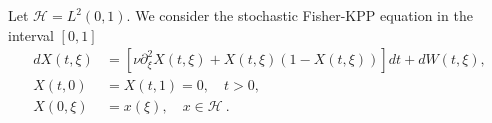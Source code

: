 Let $\mathcal{H} = L^2 (0,1)$. We consider the stochastic Fisher-KPP 
    equation in the interval $[0, 1]$
    \begin{equation}
        \label{eqn:fisher-kpp}
        \begin{aligned}
            d X(t, \xi) &= 
                \left[
                    \nu 
                    \partial_{\xi} ^ 2 X(t, \xi)
                    +
                    X(t, \xi) (1 -X(t, \xi) )
                \right]
                dt
                +
                dW(t, \xi),
            \\
            X(t, 0) &= X(t, 1) =0, \quad t>0, 
            \\
            X(0, \xi) &= x(\xi), \quad x \in 
            \mathcal{H} \ .
        \end{aligned}
    \end{equation}
    
